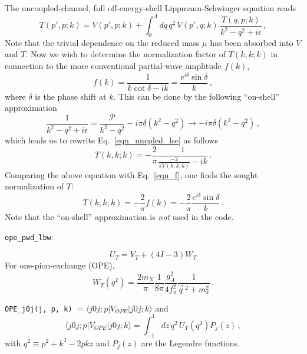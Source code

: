 \documentclass{article}
\begin{document}
The uncoupled-channel, full off-energy-shell Lippmann-Schwinger equation reads
\begin{equation}
    T(p', p; k) = V(p', p; k) + \int^\Lambda_0 dq\, q^2\, V(p', q; k)\, \frac{T(q, p; k)}{k^2 - q^2 + i\epsilon} \, ,\label{eqn_uncpled_lse}
\end{equation}
Note that the trivial dependence on the reduced mass $\mu$ has been absorbed into $V$ and $T$. Now we wish to determine the normalization factor of $T(k, k; k)$ in connection to the more conventional partial-wave amplitude $f(k)$,
\begin{equation}
    f(k) = \frac{1}{k\cot \delta - ik} = \frac{e^{i\delta} \sin \delta}{k} \, ,\label{eqn_f}
\end{equation}
where $\delta$ is the phase shift at $k$. This can be done by the following ``on-shell'' approximation
\begin{equation}
    \frac{1}{k^2 - q^2 + i\epsilon} = \frac{\mathcal{P}}{k^2 - q^2} - i\pi \delta(k^2 - q^2) \to - i\pi \delta(k^2 - q^2) \, ,
\end{equation}
which leads us to rewrite Eq.~\eqref{eqn_uncpled_lse} as follows
\begin{equation}
    T(k, k; k) = -\frac{2}{\pi} \frac{1}{\frac{-2}{\pi V(k, k; k)} - ik} \, .
\end{equation}
Comparing the above equation with Eq.~\eqref{eqn_f}, one finds the sought normalization of $T$:
\begin{equation}
    T(k, k; k) = -\frac{2}{\pi} f(k) = - \frac{2}{\pi} \frac{e^{i\delta} \sin \delta}{k} \, .
\end{equation}
Note that the ``on-shell'' approximation is \emph{not} used in the code.

\verb;ope_pwd_lbw;:

\begin{equation}
    U_T = V_T + (4I - 3)W_T
\end{equation}
For one-pion-exchange (OPE),
\begin{equation}
    W_T(q^2) = \frac{2m_N}{\pi} \frac{1}{8\pi} \frac{g_A^2}{4f_\pi^2} \frac{1}{\vec{q}\,^2 + m_\pi^2} \, .
\end{equation}

\verb;OPE_j0j(j, p, k); $= \langle j0j; p | V_{OPE} | j0j; k \rangle$ and
\begin{equation}
    \langle j0j; p | V_{OPE} | j0j; k \rangle = \int_{-1}^{1} dz\, q^2\, U_T(q^2) P_j(z) \, ,
\end{equation}
with $q^2 \equiv p^2 + k^2 - 2pk z$ and $P_j(z)$ are the Legendre functions.
\end{document}
